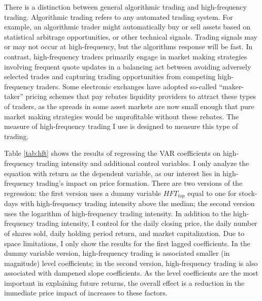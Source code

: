 	There is a distinction between general algorithmic trading and high-frequency trading. Algorithmic trading refers to any automated trading system. For example, an algorithmic trader might automatically buy or sell assets based on statistical arbitrage opportunities, or other technical signals. Trading signals may or may not occur at high-frequency, but the algorithms response will be fast. In contrast, high-frequency traders primarily engage in market making strategies involving frequent quote updates in a balancing act between avoiding adversely selected trades and capturing trading opportunities from competing high-frequency traders. Some electronic exchanges have adopted so-called ``maker-taker'' pricing schemes that pay rebates liquidity providers to attract these types of traders, as the spreads in some asset markets are now small enough that pure market making strategies would be unprofitable without these rebates. The measure of high-frequency trading I use is designed to measure this type of trading.

	Table \ref{tab:hft} shows the results of regressing the VAR coefficients on high-frequency trading intensity and additional control variables. I only analyze the equation with return as the dependent variable, as our interest lies in high-frequency trading's impact on price formation. There are two versions of the regression: the first version uses a dummy variable $HFT_{top}$ equal to one for stock-days with high-frequency trading intensity above the median; the second version uses the logarithm of high-frequency trading intensity. In addition to the high-frequency trading intensity, I control for the daily closing price, the daily number of shares sold, daily holding period return, and market capitalization. Due to space limitations, I only show the results for the first lagged coefficients. In the dummy variable version, high-frequency trading is associated smaller (in magnitude) level coefficients; in the second version, high-frequency trading is also associated with dampened slope coefficients. As the level coefficients are the most important in explaining future returns, the overall effect is a reduction in the immediate price impact of increases to these factors.

